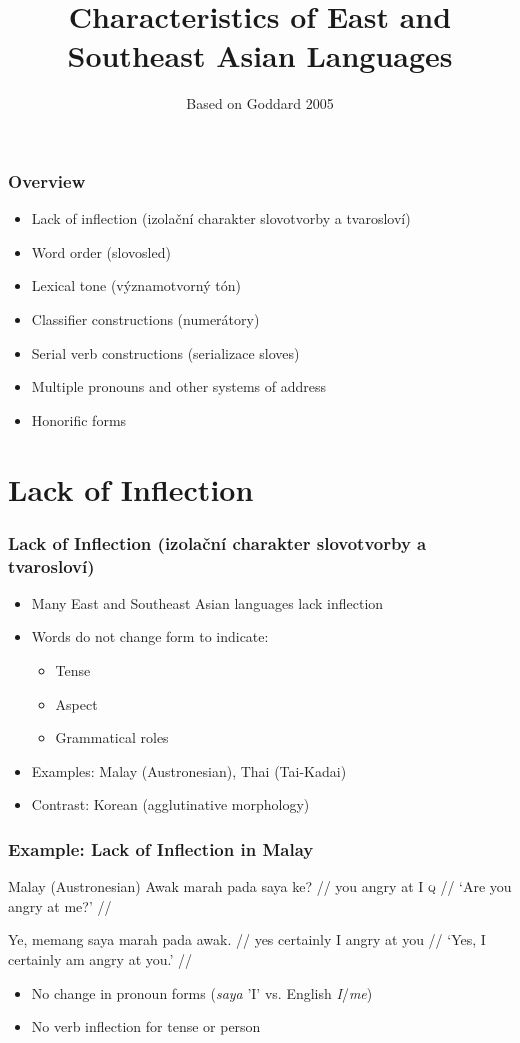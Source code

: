 \documentclass{beamer}
\title{Characteristics of East and Southeast Asian Languages}
\author{Based on Goddard 2005}
\date{}
\begin{document}
\frame{\titlepage}

\begin{frame}
\frametitle{Overview}
\begin{itemize}
\item Lack of inflection (izolační charakter slovotvorby a tvarosloví)
\item Word order (slovosled)
\item Lexical tone (významotvorný tón)
\item Classifier constructions (numerátory)
\item Serial verb constructions (serializace sloves)
\item Multiple pronouns and other systems of address
\item Honorific forms
\end{itemize}
\end{frame}

\section{Lack of Inflection}

\begin{frame}
\frametitle{Lack of Inflection (izolační charakter slovotvorby a tvarosloví)}
\begin{itemize}
\item Many East and Southeast Asian languages lack inflection
\item Words do not change form to indicate:
  \begin{itemize}
  \item Tense
  \item Aspect
  \item Grammatical roles
  \end{itemize}
\item Examples: Malay (Austronesian), Thai (Tai-Kadai)
\item Contrast: Korean (agglutinative morphology)
\end{itemize}
\end{frame}

\begin{frame}
\frametitle{Example: Lack of Inflection in Malay}
\begin{exampleblock}{Malay (Austronesian)}
  \pex
  \a \begingl
\gla Awak marah pada saya ke? //
\glb you angry at I \textsc{q} //
\glft `Are you angry at me?' //
\endgl

\a \begingl
\gla Ye, memang saya marah pada awak. //
\glb yes certainly I angry at you //
\glft `Yes, I certainly am angry at you.' //
\endgl
\xe
\end{exampleblock}
\begin{itemize}
\item No change in pronoun forms (\emph{saya} 'I' vs. English \emph{I}/\emph{me})
\item No verb inflection for tense or person
\end{itemize}
\end{frame}
\end{document}
